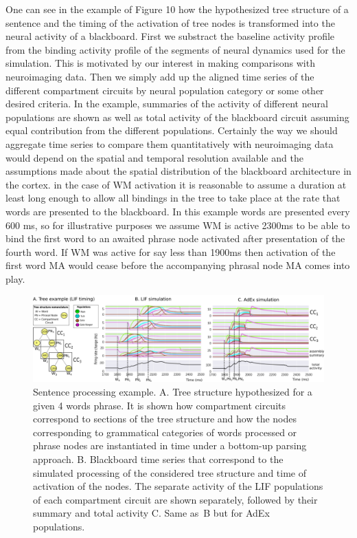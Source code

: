 \documentclass[10pt]{article}
\begin{document}
One can see in the example of Figure 10 how the hypothesized tree structure of a sentence and the timing of the activation of tree nodes is transformed into the neural activity of a blackboard.
First we substract the baseline activity profile from the binding activity profile of the segments of neural dynamics used for the simulation.
This is motivated by our interest in making comparisons with neuroimaging data.
Then we simply add up the aligned time series of the different compartment circuits by neural population category or some other desired criteria.
In the example, summaries of the activity of different neural populations are shown as well as total activity of the blackboard circuit assuming equal contribution from the different populations.
Certainly the way we should aggregate time series to compare them quantitatively with neuroimaging data would depend on the spatial and temporal resolution available and the assumptions made about the spatial distribution of the blackboard architecture in the cortex.
in the case of WM activation it is reasonable to assume a duration at least long enough to allow all bindings in the tree to take place at the rate that words are presented to the blackboard.
In this example words are presented every 600 ms, so for illustrative purposes we assume WM is active 2300ms to be able to bind the first word to an awaited phrase node activated after presentation of the fourth word.
If WM was active for say less than 1900ms then activation of the first word MA would cease before the accompanying phrasal node MA comes into play.

\begin{figure}[h!]
  \begin{center}
    \includegraphics[width=1.00\columnwidth]{figures/compartments_tree_example/compartments_tree_example}
    \caption{Sentence processing example.
A.
Tree
        structure hypothesized for a given 4 words phrase.
It is shown
        how compartment circuits correspond to sections of the tree
        structure and how the nodes corresponding to grammatical
        categories of words processed or phrase nodes are instantiated
        in time under a bottom-up parsing approach.
B.
Blackboard time
        series that correspond to the simulated processing of the
        considered tree structure and time of activation of the nodes.
        The separate activity of the LIF populations of each
        compartment circuit are shown separately, followed by their
        summary and total activity C.
Same as~B but for AdEx
        populations.
{\label{679921}}%
      }
  \end{center}
\end{figure}
\end{document}
